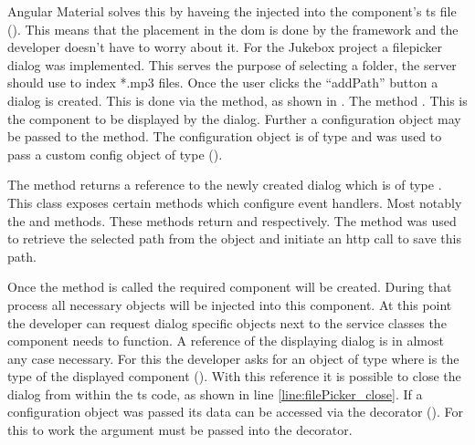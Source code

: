 Angular Material solves this by haveing the  injected into the component's \gls{ts} file (). This means that the placement in the \gls{dom} is done by the framework and the developer doesn't have to worry about it. For the Jukebox project a filepicker dialog was implemented. This serves the purpose of selecting a folder, the server should use to index *.mp3 files. Once the user clicks the \enquote{addPath} button a dialog is created. This is done via the  method, as shown in . The  method . This is the component to be displayed by the dialog. Further a configuration object may be passed to the method. The configuration object is of type  and was used to pass a custom config object of type  ().

The  method returns a reference to the newly created dialog which is of type . This class exposes certain methods which configure event handlers. Most notably the  and  methods. These methods return  and  respectively. The  method was used to retrieve the selected path from the  object and initiate an \gls{http} call to save this path.


Once the  method is called the required component will be created. During that process all necessary objects will be injected into this component. At this point the developer can request dialog specific objects next to the service classes the component needs to function. A reference of the displaying dialog is in almost any case necessary. For this the developer asks for an object of type  where  is the type of the displayed component (). With this reference it is possible to close the dialog from within the \gls{ts} code, as shown in line \ref{line:filePicker_close}. If a configuration object was passed its data can be accessed via the  decorator (). For this to work the  argument must be passed into the decorator.

